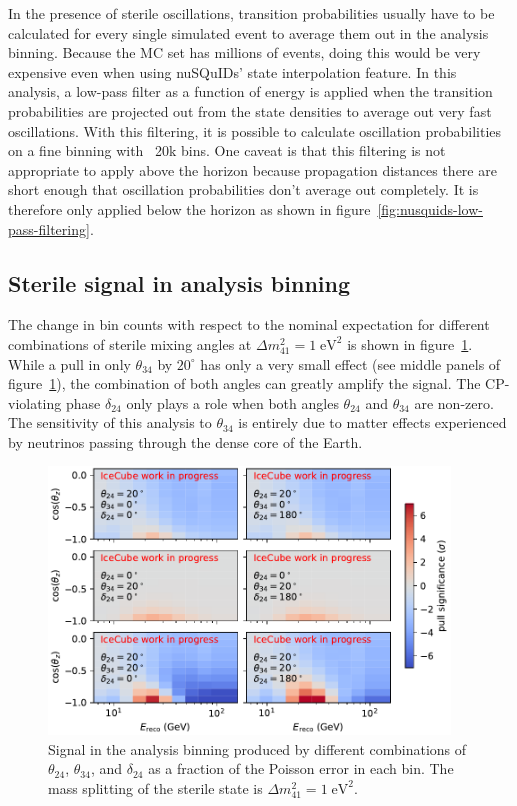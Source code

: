 In the presence of sterile oscillations, transition probabilities usually have to be calculated for every single simulated event to average them out in the analysis binning. Because the MC set has millions of events, doing this would be very expensive even when using nuSQuIDs' state interpolation feature. In this analysis, a low-pass filter as a function of energy is applied when the transition probabilities are projected out from the state densities to average out very fast oscillations. With this filtering, it is possible to calculate oscillation probabilities on a fine binning with ~20k bins. One caveat is that this filtering is not appropriate to apply above the horizon because propagation distances there are short enough that oscillation probabilities don't average out completely. It is therefore only applied below the horizon as shown in figure~\ref{fig:nusquids-low-pass-filtering}.


\subsection{Sterile signal in analysis binning}
The change in bin counts with respect to the nominal expectation for different combinations of sterile mixing angles at $\Delta m^2_{41}=1\;\mathrm{eV^2}$ is shown in figure~\ref{fig:oscillation-effects-ana-binning}. While a pull in only $\theta_{34}$ by $20^\circ$ has only a very small effect (see middle panels of figure~\ref{fig:oscillation-effects-ana-binning}), the combination of both angles can greatly amplify the signal. The CP-violating phase $\delta_{24}$ only plays a role when both angles $\theta_{24}$ and $\theta_{34}$ are non-zero. The sensitivity of this analysis to $\theta_{34}$ is entirely due to matter effects experienced by neutrinos passing through the dense core of the Earth.

\begin{figure}
    \centering
    \includegraphics[width=0.95\textwidth]{figures/measurement/sterile_analysis/oscillation_signal/pull_theta_combinations_20deg_dcp24.pdf}
    \caption{Signal in the analysis binning produced by different combinations of $\theta_{24}$, $\theta_{34}$, and $\delta_{24}$ as a fraction of the Poisson error in each bin. The mass splitting of the sterile state is $\Delta m^2_{41}=1\;\mathrm{eV^2}$.}
    \label{fig:oscillation-effects-ana-binning}
\end{figure}

